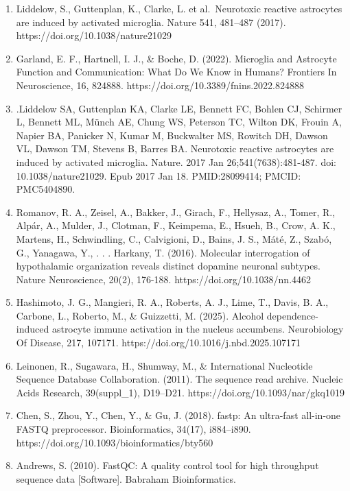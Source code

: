 \documentclass[
  10pt,
]{article}
\newcounter{none} %
\begin{document}
\begin{enumerate}
\def\labelenumi{\arabic{enumi}.}
\item
  Liddelow, S., Guttenplan, K., Clarke, L. et al.~Neurotoxic reactive
  astrocytes are induced by activated microglia. Nature 541, 481--487
  (2017). https://doi.org/10.1038/nature21029
\item
  Garland, E. F., Hartnell, I. J., \& Boche, D. (2022). Microglia and
  Astrocyte Function and Communication: What Do We Know in Humans?
  Frontiers In Neuroscience, 16, 824888.
  https://doi.org/10.3389/fnins.2022.824888
\item
  .Liddelow SA, Guttenplan KA, Clarke LE, Bennett FC, Bohlen CJ,
  Schirmer L, Bennett ML, Münch AE, Chung WS, Peterson TC, Wilton DK,
  Frouin A, Napier BA, Panicker N, Kumar M, Buckwalter MS, Rowitch DH,
  Dawson VL, Dawson TM, Stevens B, Barres BA. Neurotoxic reactive
  astrocytes are induced by activated microglia. Nature. 2017 Jan
  26;541(7638):481-487. doi: 10.1038/nature21029. Epub 2017 Jan 18.
  PMID:28099414; PMCID: PMC5404890.
\item
  Romanov, R. A., Zeisel, A., Bakker, J., Girach, F., Hellysaz, A.,
  Tomer, R., Alpár, A., Mulder, J., Clotman, F., Keimpema, E., Hsueh,
  B., Crow, A. K., Martens, H., Schwindling, C., Calvigioni, D., Bains,
  J. S., Máté, Z., Szabó, G., Yanagawa, Y., . . . Harkany, T. (2016).
  Molecular interrogation of hypothalamic organization reveals distinct
  dopamine neuronal subtypes. Nature Neuroscience, 20(2), 176-188.
  https://doi.org/10.1038/nn.4462
\item
  Hashimoto, J. G., Mangieri, R. A., Roberts, A. J., Lime, T., Davis, B.
  A., Carbone, L., Roberto, M., \& Guizzetti, M. (2025). Alcohol
  dependence-induced astrocyte immune activation in the nucleus
  accumbens. Neurobiology Of Disease, 217, 107171.
  https://doi.org/10.1016/j.nbd.2025.107171
\item
  Leinonen, R., Sugawara, H., Shumway, M., \& International Nucleotide
  Sequence Database Collaboration. (2011). The sequence read archive.
  Nucleic Acids Research, 39(suppl\_1), D19--D21.
  https://doi.org/10.1093/nar/gkq1019
\item
  Chen, S., Zhou, Y., Chen, Y., \& Gu, J. (2018). fastp: An ultra-fast
  all-in-one FASTQ preprocessor. Bioinformatics, 34(17), i884--i890.
  https://doi.org/10.1093/bioinformatics/bty560
\item
  Andrews, S. (2010). FastQC: A quality control tool for high throughput
  sequence data {[}Software{]}. Babraham Bioinformatics.

\end{enumerate}
\end{document}

